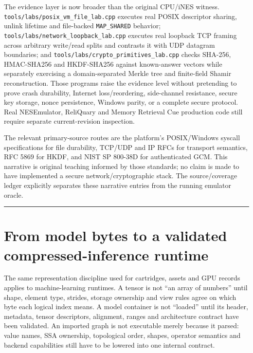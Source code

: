 The evidence layer is now broader than the original CPU/iNES witness. \texttt{tools/labs/posix\_vm\_file\_lab.cpp} executes real POSIX descriptor sharing, unlink lifetime and file-backed \texttt{MAP\_SHARED} behavior; \texttt{tools/labs/network\_loopback\_lab.cpp} executes real loopback TCP framing across arbitrary write/read splits and contrasts it with UDP datagram boundaries; and \texttt{tools/labs/crypto\_primitives\_lab.cpp} checks SHA-256, HMAC-SHA256 and HKDF-SHA256 against known-answer vectors while separately exercising a domain-separated Merkle tree and finite-field Shamir reconstruction. Those programs raise the evidence level without pretending to prove crash durability, Internet loss/reordering, side-channel resistance, secure key storage, nonce persistence, Windows parity, or a complete secure protocol. Real NESEmulator, ReliQuary and Memory Retrieval Cue production code still require separate current-revision inspection.

The relevant primary-source routes are the platform's POSIX/Windows syscall specifications for file durability, TCP/UDP and IP RFCs for transport semantics, RFC 5869 for HKDF, and NIST SP 800-38D for authenticated GCM. This narrative is original teaching informed by those standards; no claim is made to have implemented a secure network/cryptographic stack. The source/coverage ledger explicitly separates these narrative entries from the running emulator oracle.

\begin{center}\rule{0.5\linewidth}{0.5pt}\end{center}

\section{From model bytes to a validated compressed-inference runtime}\label{01-foundations-i-ch017-from-model-bytes-to-a-validated-compressed-inference-runtime}

The same representation discipline used for cartridges, assets and GPU records applies to machine-learning runtimes. A tensor is not ``an array of numbers'' until shape, element type, strides, storage ownership and view rules agree on which byte each logical index means. A model container is not ``loaded'' until its header, metadata, tensor descriptors, alignment, ranges and architecture contract have been validated. An imported graph is not executable merely because it parsed: value names, SSA ownership, topological order, shapes, operator semantics and backend capabilities still have to be lowered into one internal contract.

